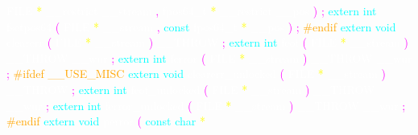 \textcolor{white}{FILE} 
\textcolor{yellow}{*} 
\textcolor{white}{\_\_restrict} 
\textcolor{white}{\_\_stream} 
\textcolor{magenta}{,} 
\textcolor{white}{fpos64\_t} 
\textcolor{yellow}{*} 
\textcolor{white}{\_\_restrict} 
\textcolor{white}{\_\_pos} 
\textcolor{magenta}{)} 
\textcolor{magenta}{;} 
\textcolor{cyan}{extern} 
\textcolor{cyan}{int} 
\textcolor{white}{fsetpos64} 
\textcolor{magenta}{(} 
\textcolor{white}{FILE} 
\textcolor{yellow}{*} 
\textcolor{white}{\_\_stream} 
\textcolor{magenta}{,} 
\textcolor{cyan}{const} 
\textcolor{white}{fpos64\_t} 
\textcolor{yellow}{*} 
\textcolor{white}{\_\_pos} 
\textcolor{magenta}{)} 
\textcolor{magenta}{;} 
\textcolor{orange}{\#endif} 
\textcolor{cyan}{extern} 
\textcolor{cyan}{void} 
\textcolor{white}{clearerr} 
\textcolor{magenta}{(} 
\textcolor{white}{FILE} 
\textcolor{yellow}{*} 
\textcolor{white}{\_\_stream} 
\textcolor{magenta}{)} 
\textcolor{white}{\_\_THROW} 
\textcolor{magenta}{;} 
\textcolor{cyan}{extern} 
\textcolor{cyan}{int} 
\textcolor{white}{feof} 
\textcolor{magenta}{(} 
\textcolor{white}{FILE} 
\textcolor{yellow}{*} 
\textcolor{white}{\_\_stream} 
\textcolor{magenta}{)} 
\textcolor{white}{\_\_THROW} 
\textcolor{white}{\_\_wur} 
\textcolor{magenta}{;} 
\textcolor{cyan}{extern} 
\textcolor{cyan}{int} 
\textcolor{white}{ferror} 
\textcolor{magenta}{(} 
\textcolor{white}{FILE} 
\textcolor{yellow}{*} 
\textcolor{white}{\_\_stream} 
\textcolor{magenta}{)} 
\textcolor{white}{\_\_THROW} 
\textcolor{white}{\_\_wur} 
\textcolor{magenta}{;} 
\textcolor{orange}{\#ifdef \_\_USE\_MISC} 
\textcolor{cyan}{extern} 
\textcolor{cyan}{void} 
\textcolor{white}{clearerr\_unlocked} 
\textcolor{magenta}{(} 
\textcolor{white}{FILE} 
\textcolor{yellow}{*} 
\textcolor{white}{\_\_stream} 
\textcolor{magenta}{)} 
\textcolor{white}{\_\_THROW} 
\textcolor{magenta}{;} 
\textcolor{cyan}{extern} 
\textcolor{cyan}{int} 
\textcolor{white}{feof\_unlocked} 
\textcolor{magenta}{(} 
\textcolor{white}{FILE} 
\textcolor{yellow}{*} 
\textcolor{white}{\_\_stream} 
\textcolor{magenta}{)} 
\textcolor{white}{\_\_THROW} 
\textcolor{white}{\_\_wur} 
\textcolor{magenta}{;} 
\textcolor{cyan}{extern} 
\textcolor{cyan}{int} 
\textcolor{white}{ferror\_unlocked} 
\textcolor{magenta}{(} 
\textcolor{white}{FILE} 
\textcolor{yellow}{*} 
\textcolor{white}{\_\_stream} 
\textcolor{magenta}{)} 
\textcolor{white}{\_\_THROW} 
\textcolor{white}{\_\_wur} 
\textcolor{magenta}{;} 
\textcolor{orange}{\#endif} 
\textcolor{cyan}{extern} 
\textcolor{cyan}{void} 
\textcolor{white}{perror} 
\textcolor{magenta}{(} 
\textcolor{cyan}{const} 
\textcolor{cyan}{char} 
\textcolor{yellow}{*} 
